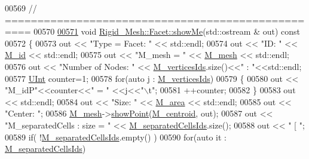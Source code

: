 \begin{DoxyCode}
00569 \textcolor{comment}{// ==================================================}
00570 
\hypertarget{RigidMesh_8cpp_source.tex_l00571}{}\hyperlink{classFVCode3D_1_1Rigid__Mesh_1_1Facet_af415677935a5c7a37f12f04fe10abf0d}{00571} \textcolor{keywordtype}{void} \hyperlink{classFVCode3D_1_1Rigid__Mesh_1_1Facet_af415677935a5c7a37f12f04fe10abf0d}{Rigid\_Mesh::Facet::showMe}(std::ostream & out)\textcolor{keyword}{ const}
00572 \textcolor{keyword}{}\{
00573     out << \textcolor{stringliteral}{"Type = Facet: "} << std::endl;
00574     out << \textcolor{stringliteral}{"ID: "} << \hyperlink{classFVCode3D_1_1Rigid__Mesh_1_1Facet_a00456afaee76a9be2a9beb4180a76d15}{M\_id} << std::endl;
00575     out << \textcolor{stringliteral}{"M\_mesh = "} << \hyperlink{classFVCode3D_1_1Rigid__Mesh_1_1Facet_af220d353a3aad7de9b1fa293ac594893}{M\_mesh} << std::endl;
00576     out << \textcolor{stringliteral}{"Number of Nodes: "} << \hyperlink{classFVCode3D_1_1Rigid__Mesh_1_1Facet_a4db7298b2b4607ec53de41887df9a025}{M\_verticesIds}.size()<<\textcolor{stringliteral}{" : "}<<std::endl;
00577     \hyperlink{namespaceFVCode3D_a4bf7e328c75d0fd504050d040ebe9eda}{UInt} counter=1;
00578     \textcolor{keywordflow}{for}(\textcolor{keyword}{auto} j : \hyperlink{classFVCode3D_1_1Rigid__Mesh_1_1Facet_a4db7298b2b4607ec53de41887df9a025}{M\_verticesIds})
00579     \{
00580         out << \textcolor{stringliteral}{"M\_idP"}<<counter<<\textcolor{stringliteral}{" = "} <<j<<\textcolor{stringliteral}{"\(\backslash\)t"};
00581         ++counter;
00582     \}
00583     out << std::endl;
00584     out << \textcolor{stringliteral}{"Size: "} << \hyperlink{classFVCode3D_1_1Rigid__Mesh_1_1Facet_a084cfcf931748437c2d551a43fdbd47d}{M\_area} << std::endl;
00585     out << \textcolor{stringliteral}{"Center: "};
00586     \hyperlink{classFVCode3D_1_1Rigid__Mesh_1_1Facet_af220d353a3aad7de9b1fa293ac594893}{M\_mesh}->\hyperlink{classFVCode3D_1_1Rigid__Mesh_a3bbdb25ce1eddaf66316487bfc05e089}{showPoint}(\hyperlink{classFVCode3D_1_1Rigid__Mesh_1_1Facet_a59362b500ff0b33abe8b2bc2ea678916}{M\_centroid}, out);
00587     out << \textcolor{stringliteral}{"M\_separatedCells : size = "} << \hyperlink{classFVCode3D_1_1Rigid__Mesh_1_1Facet_ab6e36f3b09142a9cf4955c4be825cf11}{M\_separatedCellsIds}.size();
00588     out << \textcolor{stringliteral}{"    [ "};
00589     \textcolor{keywordflow}{if}( !\hyperlink{classFVCode3D_1_1Rigid__Mesh_1_1Facet_ab6e36f3b09142a9cf4955c4be825cf11}{M\_separatedCellsIds}.empty() )
00590         \textcolor{keywordflow}{for}(\textcolor{keyword}{auto} it : \hyperlink{classFVCode3D_1_1Rigid__Mesh_1_1Facet_ab6e36f3b09142a9cf4955c4be825cf11}{M\_separatedCellsIds})

\end{DoxyCode}

